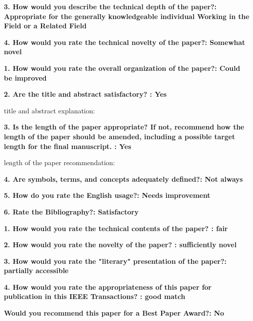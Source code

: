 \documentclass[12pt]{article}
\begin{document}
\textbf{3. How would you describe the technical depth of the paper?: Appropriate for the generally knowledgeable individual Working in the Field or a Related Field}

\textbf{4. How would you rate the technical novelty of the paper?: Somewhat novel}

\textbf{1. How would you rate the overall organization of the paper?: Could be improved}

\textbf{2. Are the title and abstract satisfactory? : Yes}

title and abstract explanation:

\textbf{3. Is the length of the paper appropriate? If not, recommend how the length of the paper should be amended, including a possible target length for the final manuscript. : Yes}

length of the paper recommendation:

\textbf{4. Are symbols, terms, and concepts adequately defined?: Not always}

\textbf{5. How do you rate the English usage?: Needs improvement}

\textbf{6. Rate the Bibliography?: Satisfactory}

\textbf{1. How would you rate the technical contents of the paper? : fair}

\textbf{2. How would you rate the novelty of the paper? : sufficiently novel}

\textbf{3. How would you rate the "literary" presentation of the paper?: partially accessible}

\textbf{4. How would you rate the appropriateness of this paper for publication in this IEEE Transactions? : good match}

\textbf{Would you recommend this paper for a Best Paper Award?: No}
\end{document}
